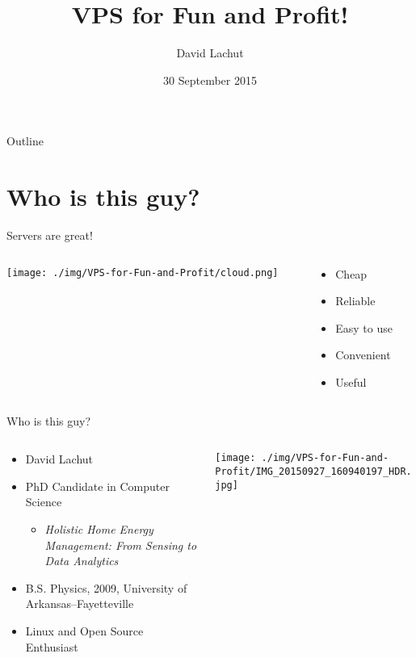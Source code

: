 \documentclass[presentation,aspectratio=169]{beamer}
\author{David Lachut}
\date{30 September 2015}
\title{VPS for Fun and Profit!}
\begin{document}
\maketitle
\begin{frame}{Outline}
\setcounter{tocdepth}{1}
\tableofcontents
\end{frame}


\section{Who is this guy?}
\label{sec-1}
\begin{frame}[label=sec-1-0-1]{Servers are great!}
\begin{columns}
\begin{column}{0.45\textwidth}

\texttt{[image: ./img/VPS-for-Fun-and-Profit/cloud.png]}
\end{column}

\begin{column}{0.45\textwidth}

\begin{itemize}
\item Cheap
\item Reliable
\item Easy to use
\item Convenient
\item Useful
\end{itemize}
\end{column}
\end{columns}
\end{frame}

\begin{frame}[label=sec-1-0-2]{Who is this guy?}
\begin{columns}
\begin{column}{0.45\textwidth}

\begin{itemize}
\item David Lachut
\item PhD Candidate in Computer Science
\begin{itemize}
\item \emph{Holistic Home Energy Management: From Sensing to Data Analytics}
\end{itemize}
\item B.S. Physics, 2009, University of Arkansas--Fayetteville
\item Linux and Open Source Enthusiast
\end{itemize}
\end{column}

\begin{column}{0.45\textwidth}

\texttt{[image: ./img/VPS-for-Fun-and-Profit/IMG\_20150927\_160940197\_HDR.jpg]}
\end{column}
\end{columns}
\end{frame}
\end{document}
